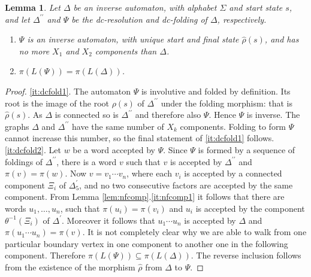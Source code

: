 \documentclass[a4paper,12pt]{article}
\newcommand{\D}{\Delta }
\renewcommand{\L}{\Lambda }
\renewcommand{\S}{\Sigma }
\newtheorem{lemma}[theorem]{Lemma}
\numberwithin{equation}{section}
\numberwithin{figure}{section}
\newcommand{\be}{\begin{enumerate}}
\newcommand{\ee}{\end{enumerate}}
\begin{document}
\begin{lemma}\label{lem:dcfold}
Let $\D$ be  an inverse automaton, with alphabet $\S$ and start
state $s$, and let $\D^{\prime\prime}$  and $\Psi$ be the
dc-resolution and dc-folding of $\D$, respectively. \be \item
\label{it:dcfold1} $\Psi$ is an inverse automaton, with unique
start and  final state $\hat\rho(s)$, and has no more $X_1$ and
$X_2$ components than $\D$. \item \label{it:dcfold2}
$\pi(L(\Psi))=\pi(L(\D))$. \ee
\end{lemma}
\begin{proof}
\ref{it:dcfold1}.
The automaton $\Psi$ is involutive and folded by definition.
 Its root is the image of the root $\rho(s)$ of $\D^{\prime\prime}$ under
 the folding morphism: that is $\hat\rho(s)$.
 As
$\D$ is connected  so is $\D^{\prime\prime}$ and therefore also
$\Psi$. Hence $\Psi$ is inverse. The graphs $\D$ and
$\D^{\prime\prime}$  have the same number of $X_k$ components.
Folding to form $\Psi$ cannot increase this number, so the final
statement of \ref{it:dcfold1} follows.
 \\[1em]
\ref{it:dcfold2}. Let $w$ be a word accepted by $\Psi$. Since
$\Psi$ is formed by a sequence of foldings of $\D^{\prime\prime}$,
there is a word $v$ such that $v$ is accepted by
$\D^{\prime\prime}$ and $\pi(v)=\pi(w)$. Now $v=v_1\cdots v_n$,
where each $v_i$ is accepted by a connected component $\Xi_i$ of
$\D^\prime_5$, and no two consecutive factors are accepted by the
same component. From Lemma \ref{lem:nfcomp}.\ref{it:nfcomp1} it
follows that there are words $u_1,\ldots , u_n$, such that
$\pi(u_i)=\pi(v_i)$ and $u_i$ is accepted by the component
$\theta^{-1}(\Xi_i)$ of $\D^\prime$. Moreover it follows that
$u_1\cdots u_n$ is accepted by $\D$ and $\pi(u_1\cdots
u_n)=\pi(v)$. {\ef It is not completely clear why we are able to
walk from one particular boundary vertex in one component to
another one in the following component.} Therefore
$\pi(L(\Psi))\subseteq \pi(L(\D))$. The reverse inclusion follows
from the existence of the morphism $\hat\rho$ from $\D$ to $\Psi$.

\end{proof}
\end{document}
